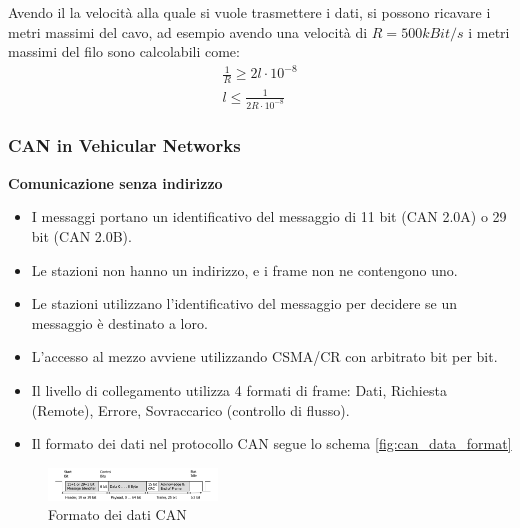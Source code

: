 Avendo il la velocità alla quale si vuole trasmettere i dati, si possono ricavare i metri massimi del cavo, ad esempio avendo una velocità di $R = 500kBit/s$ i metri massimi del filo sono calcolabili come:
\begin{align}
  \frac{1}{R} \geq 2 l \cdot 10^{-8} \\
  l \leq \frac{1}{2R \cdot 10^{-8}}
  \label{eq:calcolo_lunghezza_massima_filo}
\end{align}

\subsubsection{CAN in Vehicular Networks}
\textbf{Comunicazione senza indirizzo}
\begin{itemize}
    \item I messaggi portano un identificativo del messaggio di 11 bit (CAN 2.0A) o 29 bit (CAN 2.0B).
    \item Le stazioni non hanno un indirizzo, e i frame non ne contengono uno.
    \item Le stazioni utilizzano l'identificativo del messaggio per decidere se un messaggio è destinato a loro.
    \item L'accesso al mezzo avviene utilizzando CSMA/CR con arbitrato bit per bit.
    \item Il livello di collegamento utilizza 4 formati di frame: Dati, Richiesta (Remote), Errore, Sovraccarico (controllo di flusso).
    \item Il formato dei dati nel protocollo CAN segue lo schema \autoref{fig:can_data_format}
\end{itemize}

\begin{figure}[!ht]
  \centering
  \includegraphics[width=0.4\textwidth]{./images/can_data_format.png}
  \caption{Formato dei dati CAN}
  \label{fig:can_data_format}
\end{figure}

